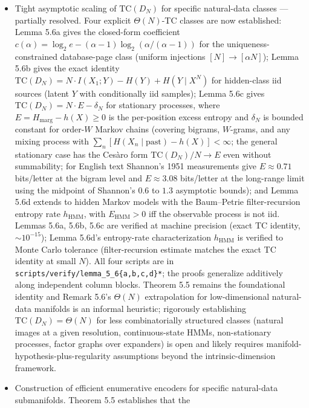 \documentclass[
]{article}
\begin{document}
\begin{itemize}
  \emph{for the bare rule} remain open (Remark 6.6e).
\item
  Tight asymptotic scaling of $\mathrm{TC}(D_N)$ for specific
  natural-data classes --- partially resolved. Four explicit
  $\Theta(N)$-TC classes are now established:
  Lemma 5.6a gives the closed-form coefficient
  $c(\alpha) = \log_2 e - (\alpha-1)\log_2(\alpha/(\alpha-1))$ for
  the uniqueness-constrained database-page class (uniform
  injections $[N] \to [\alpha N]$); Lemma 5.6b gives the exact
  identity $\mathrm{TC}(D_N) = N \cdot I(X_1; Y) - H(Y)
  + H(Y \mid X^N)$ for hidden-class iid sources (latent $Y$ with
  conditionally iid samples); Lemma 5.6c gives
  $\mathrm{TC}(D_N) = N \cdot E - \delta_N$ for stationary
  processes, where $E = H_{\mathrm{marg}} - h(X) \geq 0$ is the
  per-position excess entropy and $\delta_N$ is bounded constant
  for order-$W$ Markov chains (covering bigrams, $W$-grams, and
  any mixing process with $\sum_n [H(X_n \mid \mathrm{past}) - h(X)]
  < \infty$; the general stationary case has the Ces\`aro form
  $\mathrm{TC}(D_N)/N \to E$ even without summability; for English
  text Shannon's 1951 measurements give $E \approx 0.71$ bits/letter
  at the bigram level and $E \approx 3.08$ bits/letter at the
  long-range limit using the midpoint of Shannon's $0.6$ to $1.3$
  asymptotic bounds); and Lemma 5.6d extends to hidden Markov models
  with the Baum--Petrie filter-recursion entropy rate
  $h_{\mathrm{HMM}}$, with $E_{\mathrm{HMM}} > 0$ iff the observable
  process is not iid.
  Lemmas 5.6a, 5.6b, 5.6c are verified at machine precision (exact
  TC identity, $\sim 10^{-15}$); Lemma 5.6d's entropy-rate
  characterization $h_{\mathrm{HMM}}$ is verified to Monte Carlo
  tolerance (filter-recursion estimate matches the exact TC identity
  at small $N$). All four scripts are in
  \texttt{scripts/verify/lemma\_5\_6\{a,b,c,d\}*}; the proofs
  generalize additively along independent column blocks.
  Theorem 5.5 remains the foundational identity and Remark 5.6's
  $\Theta(N)$ extrapolation for low-dimensional natural-data
  manifolds is an informal heuristic; rigorously establishing
  $\mathrm{TC}(D_N) = \Theta(N)$ for less combinatorially structured
  classes (natural images at a given resolution, continuous-state
  HMMs, non-stationary processes, factor graphs over expanders) is
  open and likely requires manifold-hypothesis-plus-regularity
  assumptions beyond the intrinsic-dimension framework.
\item
  Construction of efficient enumerative encoders for specific
  natural-data submanifolds. Theorem 5.5 establishes that the

\end{itemize}
\end{document}
